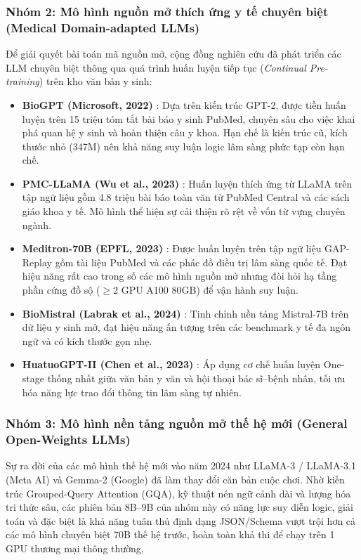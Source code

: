 \subsubsection{Nhóm 2: Mô hình nguồn mở thích ứng y tế chuyên biệt (Medical Domain-adapted LLMs)}
Để giải quyết bài toán mã nguồn mở, cộng đồng nghiên cứu đã phát triển các LLM chuyên biệt thông qua quá trình huấn luyện tiếp tục (\emph{Continual Pre-training}) trên kho văn bản y sinh:
\begin{itemize}
    \item \textbf{BioGPT (Microsoft, 2022)} \cite{luo2022biogpt}: Dựa trên kiến trúc GPT-2, được tiền huấn luyện trên 15 triệu tóm tắt bài báo y sinh PubMed, chuyên sâu cho việc khai phá quan hệ y sinh và hoàn thiện câu y khoa. Hạn chế là kiến trúc cũ, kích thước nhỏ (347M) nên khả năng suy luận logic lâm sàng phức tạp còn hạn chế.
    \item \textbf{PMC-LLaMA (Wu et al., 2023)} \cite{wu2023pmc}: Huấn luyện thích ứng từ LLaMA trên tập ngữ liệu gồm 4.8 triệu bài báo toàn văn từ PubMed Central và các sách giáo khoa y tế. Mô hình thể hiện sự cải thiện rõ rệt về vốn từ vựng chuyên ngành.
    \item \textbf{Meditron-70B (EPFL, 2023)} \cite{chen2023meditron}: Được huấn luyện trên tập ngữ liệu GAP-Replay gồm tài liệu PubMed và các phác đồ điều trị lâm sàng quốc tế. Đạt hiệu năng rất cao trong số các mô hình nguồn mở nhưng đòi hỏi hạ tầng phần cứng đồ sộ ($\ge 2$ GPU A100 80GB) để vận hành suy luận.
    \item \textbf{BioMistral (Labrak et al., 2024)} \cite{labrak2024biomistral}: Tinh chỉnh nền tảng Mistral-7B trên dữ liệu y sinh mở, đạt hiệu năng ấn tượng trên các benchmark y tế đa ngôn ngữ và có kích thước gọn nhẹ.
    \item \textbf{HuatuoGPT-II (Chen et al., 2023)} \cite{chen2023huatuogpt}: Áp dụng cơ chế huấn luyện One-stage thống nhất giữa văn bản y văn và hội thoại bác sĩ--bệnh nhân, tối ưu hóa năng lực trao đổi thông tin lâm sàng tự nhiên.
\end{itemize}

\subsubsection{Nhóm 3: Mô hình nền tảng nguồn mở thế hệ mới (General Open-Weights LLMs)}
Sự ra đời của các mô hình thế hệ mới vào năm 2024 như LLaMA-3 / LLaMA-3.1 (Meta AI) \cite{llama3_2024} và Gemma-2 (Google) \cite{gemma2_2024} đã làm thay đổi căn bản cuộc chơi. Nhờ kiến trúc Grouped-Query Attention (GQA), kỹ thuật nén ngữ cảnh dài và lượng hóa tri thức sâu, các phiên bản 8B--9B của nhóm này có năng lực suy diễn logic, giải toán và đặc biệt là khả năng tuân thủ định dạng JSON/Schema vượt trội hơn cả các mô hình chuyên biệt 70B thế hệ trước, hoàn toàn khả thi để chạy trên 1 GPU thương mại thông thường.


